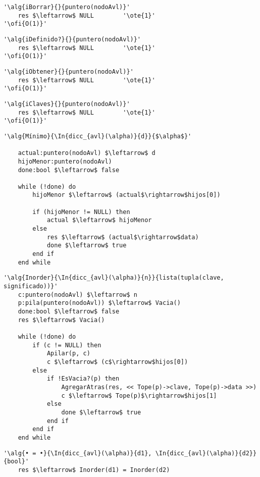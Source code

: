 \begin{lstlisting}[mathescape]
'\alg{iBorrar}{}{puntero(nodoAvl)}'
	res $\leftarrow$ NULL		 '\ote{1}'
'\ofi{O(1)}'
\end{lstlisting}

\begin{lstlisting}[mathescape]
'\alg{iDefinido?}{}{puntero(nodoAvl)}'
	res $\leftarrow$ NULL		 '\ote{1}'
'\ofi{O(1)}'
\end{lstlisting}

\begin{lstlisting}[mathescape]
'\alg{iObtener}{}{puntero(nodoAvl)}'
	res $\leftarrow$ NULL		 '\ote{1}'
'\ofi{O(1)}'
\end{lstlisting}

\begin{lstlisting}[mathescape]
'\alg{iClaves}{}{puntero(nodoAvl)}'
	res $\leftarrow$ NULL		 '\ote{1}'
'\ofi{O(1)}'
\end{lstlisting}

\begin{lstlisting}[mathescape]
'\alg{Mínimo}{\In{dicc_{avl}(\alpha)}{d}}{$\alpha$}'

	actual:puntero(nodoAvl) $\leftarrow$ d
	hijoMenor:puntero(nodoAvl)
	done:bool $\leftarrow$ false

	while (!done) do
		hijoMenor $\leftarrow$ (actual$\rightarrow$hijos[0])

		if (hijoMenor != NULL) then
			actual $\leftarrow$ hijoMenor
		else
			res $\leftarrow$ (actual$\rightarrow$data)
			done $\leftarrow$ true
		end if
	end while
\end{lstlisting}

\begin{lstlisting}[mathescape]
'\alg{Inorder}{\In{dicc_{avl}(\alpha)}{n}}{lista(tupla(clave, significado))}'
	c:puntero(nodoAvl) $\leftarrow$ n
	p:pila(puntero(nodoAvl)) $\leftarrow$ Vacia()
	done:bool $\leftarrow$ false
	res $\leftarrow$ Vacia()

	while (!done) do
		if (c != NULL) then
			Apilar(p, c)
			c $\leftarrow$ (c$\rightarrow$hijos[0])
		else
			if !EsVacia?(p) then
				AgregarAtras(res, << Tope(p)->clave, Tope(p)->data >>)
				c $\leftarrow$ Tope(p)$\rightarrow$hijos[1]
			else
				done $\leftarrow$ true
			end if
		end if
	end while
\end{lstlisting}

\begin{lstlisting}[mathescape]
'\alg{• = •}{\In{dicc_{avl}(\alpha)}{d1}, \In{dicc_{avl}(\alpha)}{d2}}{bool}'
	res $\leftarrow$ Inorder(d1) = Inorder(d2)
\end{lstlisting}
